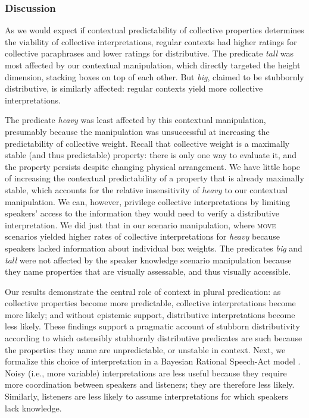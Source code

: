 \documentclass[linguex]{sp}
\begin{document}

\subsubsection{Discussion}

As we would expect if contextual predictability of collective properties determines the viability of collective interpretations, regular contexts had higher ratings for collective paraphrases and lower ratings for distributive. The predicate \textit{tall} was most affected by our contextual manipulation, which directly targeted the height dimension, stacking boxes on top of each other. But \emph{big}, claimed to be stubbornly distributive, is similarly affected: regular contexts yield more collective interpretations. 

The predicate \emph{heavy} was least affected by this contextual manipulation, presumably because the manipulation was unsuccessful at increasing the predictability of collective weight. Recall that collective weight is a maximally stable (and thus predictable) property: there is only one way to evaluate it, and the property persists despite changing physical arrangement. We have little hope of increasing the contextual predictability of a property that is already maximally stable, which accounts for the relative insensitivity of \emph{heavy} to our contextual manipulation. We can, however, privilege collective interpretations by limiting speakers' access to the information they would need to verify a distributive interpretation. We did just that in our scenario manipulation, where \textsc{move} scenarios yielded higher rates of collective interpretations for \emph{heavy} because speakers lacked information about individual box weights. The predicates \emph{big} and \emph{tall} were not affected by the speaker knowledge scenario manipulation because they name properties that are visually assessable, and thus visually accessible.

Our results demonstrate the central role of context in plural predication: as collective properties become more predictable, collective interpretations become more likely; and without epistemic support, distributive interpretations become less likely. These findings support a pragmatic account of stubborn distributivity according to which ostensibly stubbornly distributive predicates are such because the properties they name are unpredictable, or unstable in context. Next, we formalize this choice of interpretation in a Bayesian Rational Speech-Act model \citep{frankgoodman2012,lassitergoodman2013}. Noisy (i.e., more variable) interpretations are less useful because they require more coordination between speakers and listeners; they are therefore less likely. Similarly, listeners are less likely to assume interpretations for which speakers lack knowledge.
\end{document}
